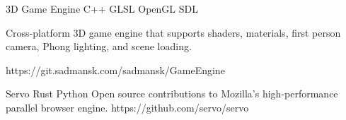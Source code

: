 



\begin{cvprojects}

\cvproject
{3D Game Engine}
{C++ \textbullet{} GLSL \textbullet{} OpenGL \textbullet{} SDL}
{
Cross-platform 3D game engine that supports shaders, materials, first person camera, Phong lighting, and scene loading.
    \begin{cvitems}\end{cvitems} %
}
{https://git.sadmansk.com/sadmansk/GameEngine}


\cvproject
{Servo}
{Rust \textbullet{} Python}
{
Open source contributions to Mozilla's high-performance parallel browser engine.
}
{https://github.com/servo/servo}


\end{cvprojects}

